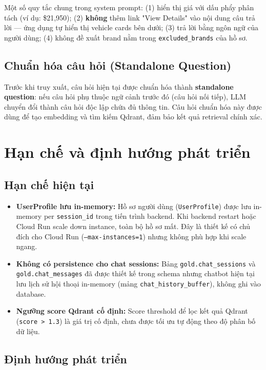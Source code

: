 Một số quy tắc chung trong system prompt: (1) hiển thị giá với dấu phẩy phân tách (ví dụ: \$21,950); (2) \textbf{không} thêm link "View Details" vào nội dung câu trả lời — ứng dụng tự hiển thị vehicle cards bên dưới; (3) trả lời bằng ngôn ngữ của người dùng; (4) không đề xuất brand nằm trong \texttt{excluded\_brands} của hồ sơ.

\subsection{Chuẩn hóa câu hỏi (Standalone Question)}

Trước khi truy xuất, câu hỏi hiện tại được chuẩn hóa thành \textbf{standalone question}: nếu câu hỏi phụ thuộc ngữ cảnh trước đó (câu hỏi nối tiếp), LLM chuyển đổi thành câu hỏi độc lập chứa đủ thông tin. Câu hỏi chuẩn hóa này được dùng để tạo embedding và tìm kiếm Qdrant, đảm bảo kết quả retrieval chính xác.

\section{Hạn chế và định hướng phát triển}

\subsection{Hạn chế hiện tại}

\begin{itemize}[noitemsep, topsep=2pt]
    \item \textbf{UserProfile lưu in-memory:} Hồ sơ người dùng (\texttt{UserProfile}) được lưu in-memory per \texttt{session\_id} trong tiến trình backend. Khi backend restart hoặc Cloud Run scale down instance, toàn bộ hồ sơ mất. Đây là thiết kế có chủ đích cho Cloud Run (\texttt{--max-instances=1}) nhưng không phù hợp khi scale ngang.
    \item \textbf{Không có persistence cho chat sessions:} Bảng \texttt{gold.chat\_sessions} và \texttt{gold.chat\_messages} đã được thiết kế trong schema nhưng chatbot hiện tại lưu lịch sử hội thoại in-memory (mảng \texttt{chat\_history\_buffer}), không ghi vào database.
    \item \textbf{Ngưỡng score Qdrant cố định:} Score threshold để lọc kết quả Qdrant (\texttt{score > 1.3}) là giá trị cố định, chưa được tối ưu tự động theo độ phân bố dữ liệu.
\end{itemize}

\subsection{Định hướng phát triển}

